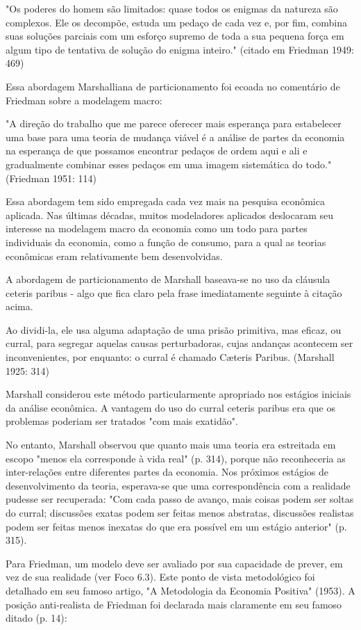 \documentclass[12pt]{article}
\begin{document}
"Os poderes do homem são limitados: quase todos os enigmas da natureza são complexos. Ele os decompõe, estuda um pedaço de cada vez e, por fim, combina suas soluções parciais com um esforço supremo de toda a sua pequena força em algum tipo de tentativa de solução do enigma inteiro."
(citado em Friedman 1949: 469)

Essa abordagem Marshalliana de particionamento foi ecoada no comentário de Friedman sobre a modelagem macro:

"A direção do trabalho que me parece oferecer mais esperança para estabelecer uma base para uma teoria de mudança viável é a análise de partes da economia na esperança de que possamos encontrar pedaços de ordem aqui e ali e gradualmente combinar esses pedaços em uma imagem sistemática do todo."
(Friedman 1951: 114)

Essa abordagem tem sido empregada cada vez mais na pesquisa econômica aplicada. Nas últimas décadas, muitos modeladores aplicados deslocaram seu interesse na modelagem macro da economia como um todo para partes individuais da economia, como a função de consumo, para a qual as teorias econômicas eram relativamente bem desenvolvidas.

A abordagem de particionamento de Marshall baseava-se no uso da cláusula ceteris paribus - algo que fica claro pela frase imediatamente seguinte à citação acima.

Ao dividi-la, ele usa alguma adaptação de uma prisão primitiva, mas eficaz, ou curral, para segregar aquelas causas perturbadoras, cujas andanças acontecem ser inconvenientes, por enquanto: o curral é chamado Cæteris Paribus.
(Marshall 1925: 314)

Marshall considerou este método particularmente apropriado nos estágios iniciais da análise econômica. A vantagem do uso do curral ceteris paribus era que os problemas poderiam ser tratados "com mais exatidão".

No entanto, Marshall observou que quanto mais uma teoria era estreitada em escopo "menos ela corresponde à vida real" (p. 314), porque não reconheceria as inter-relações entre diferentes partes da economia. Nos próximos estágios de desenvolvimento da teoria, esperava-se que uma correspondência com a realidade pudesse ser recuperada: "Com cada passo de avanço, mais coisas podem ser soltas do curral; discussões exatas podem ser feitas menos abstratas, discussões realistas podem ser feitas menos inexatas do que era possível em um estágio anterior" (p. 315).

Para Friedman, um modelo deve ser avaliado por sua capacidade de prever, em vez de sua realidade (ver Foco 6.3). Este ponto de vista metodológico foi detalhado em seu famoso artigo, "A Metodologia da Economia Positiva" (1953). A posição anti-realista de Friedman foi declarada mais claramente em seu famoso ditado (p. 14):
\end{document}
